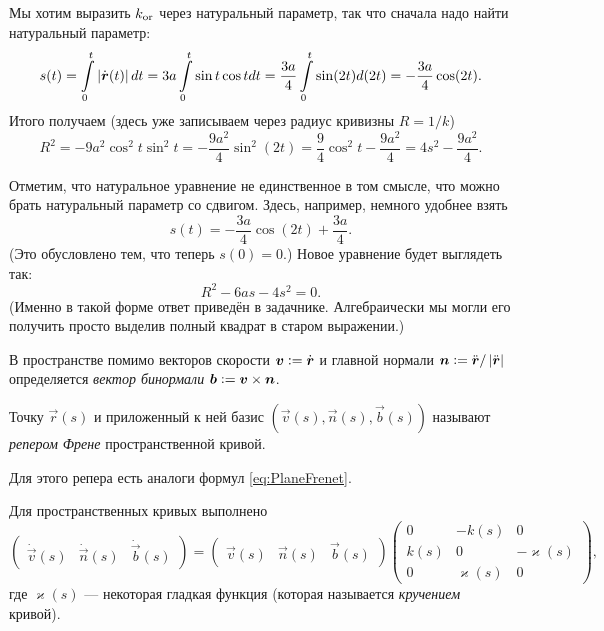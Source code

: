 \begin{solution}
	Мы хотим выразить $k_{\Or}$ через натуральный параметр, так что сначала надо найти натуральный параметр:
	\[
		s(t) = \int\limits_0^t\abs{\dot{\vec{r}}(t)}dt = 3a\int\limits_0^t\sin t\cos tdt = \frac{3a}{4}\int\limits_0^t\sin(2t) d(2t) = -\frac{3a}{4}\cos(2t).
	\]
	Итого получаем (здесь уже записываем через радиус кривизны $R = 1 / k$)
	\[
		R^2 = -9a^2\cos^2t\sin^2t = -\frac{9a^2}{4}\sin^2(2t) = \frac{9}{4}\cos^2t - \frac{9a^2}{4} = 4s^2 - \frac{9a^2}{4}.
	\]

	Отметим, что натуральное уравнение не единственное в том смысле, что можно брать натуральный параметр со сдвигом. Здесь, например, немного удобнее взять
	\[
		s(t) = -\frac{3a}{4}\cos(2t) + \frac{3a}{4}.
	\]
	(Это обусловлено тем, что теперь $s(0) = 0$.) Новое уравнение будет выглядеть так:
	\[
		R^2 - 6as - 4s^2 = 0.
	\]
	(Именно в такой форме ответ приведён в задачнике. Алгебраически мы могли его получить просто выделив полный квадрат в старом выражении.)
\end{solution}

В пространстве помимо векторов скорости $\vec{v} \vcentcolon = \dot{\vec{r}}$ и главной нормали $\vec{n} \vcentcolon = \ddot{\vec{r}} / \abs{\ddot{\vec{r}}}$ определяется \textit{вектор бинормали} $\vec{b} \vcentcolon = \vec{v} \times \vec{n}$.

\begin{definition}
	Точку $\vec{r}(s)$ и приложенный к ней базис $(\vec{v}(s), \vec{n}(s), \vec{b}(s))$ называют \textit{репером Френе} пространственной кривой.
\end{definition}

Для этого репера есть аналоги формул \eqref{eq:PlaneFrenet}.

\begin{theorem}
	Для пространственных кривых выполнено
	\begin{equation} \label{eq:SpaceFrenet}
		\begin{pmatrix}
			\dot{\vec{v}}(s) & \dot{\vec{n}}(s) & \dot{\vec{b}}(s)
		\end{pmatrix} = 
		\begin{pmatrix}
			\vec{v}(s) & \vec{n}(s) & \vec{b}(s)
		\end{pmatrix}
		\begin{pmatrix}
			0 & -k(s) & 0 \\
			k(s) & 0 & -\varkappa(s) \\
			0 & \varkappa(s) & 0
		\end{pmatrix},
	\end{equation}
	где $\varkappa(s)$ --- некоторая гладкая функция (которая называется \textit{кручением} кривой).
\end{theorem}

